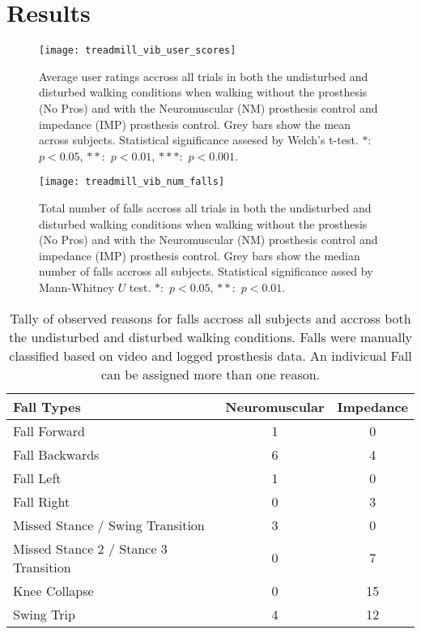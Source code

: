 \section{Results}
\begin{figure}[h]
    \centering 
    \texttt{[image: treadmill\_vib\_user\_scores]}
    \caption{Average user ratings accross all trials in both the undisturbed and
    disturbed walking conditions when walking without the prosthesis (No Pros)
    and with the Neuromuscular (NM) prosthesis control and impedance (IMP)
    prosthesis control. Grey bars show the mean across subjects.
    Statistical significance assesed by Welch's t-test. $*$:~$p < 0.05$,
    $**$:~$p < 0.01$, $***$:~$p < 0.001$.}\label{fig:treadmill_user_ratings}
\end{figure}

\begin{figure}[h]
    \centering 
    \texttt{[image: treadmill\_vib\_num\_falls]}
    \caption{Total number of falls accross all trials in both the undisturbed
    and disturbed walking conditions when walking without the prosthesis (No
    Pros) and with the Neuromuscular (NM) prosthesis control and impedance (IMP)
    prosthesis control. Grey bars show the median number of falls accross all
    subjects. Statistical significance assed by Mann-Whitney $U$ test. $*$:~$p <
    0.05$, $**$:~$p < 0.01$.}\label{fig:treadmill_exp_falls}
\end{figure}

\begin{table}[h]
  \footnotesize%
  \begin{center}
    \begin{tabular}{lcc}
      \toprule
      Fall Types & Neuromuscular & Impedance \\
      \midrule
      Fall Forward &  1 &  0 \\
      Fall Backwards &  6 &  4 \\
      Fall Left &  1 &  0 \\
      Fall Right &  0 &  3 \\
      Missed Stance / Swing Transition &  3 &  0 \\
      Missed Stance 2 / Stance 3 Transition &  0 &  7 \\
      Knee Collapse & 0 & 15 \\
      Swing Trip & 4 & 12 \\
      \bottomrule
    \end{tabular}
  \end{center}
  \caption{Tally of observed reasons for falls accross all subjects and accross
  both the undisturbed and disturbed walking conditions. Falls were manually
  classified based on video and logged prosthesis data. An indivicual Fall can
  be assigned more than one reason.}\label{tab:treadmill_exp_fall_reasons}
\end{table}

